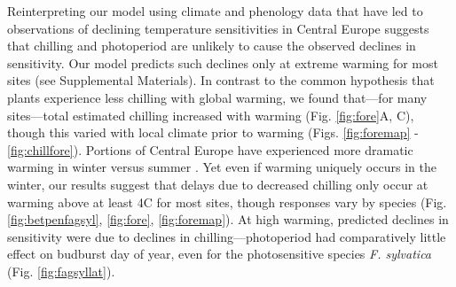 \documentclass{article}
\begin{document}

\par Reinterpreting our model using climate and phenology data that have led to observations of declining temperature sensitivities in Central Europe suggests that chilling and photoperiod are unlikely to cause the observed declines in sensitivity. Our model predicts such declines only at extreme warming for most sites (see Supplemental Materials). In contrast to the common hypothesis that plants experience less chilling with global warming, we found that---for many sites---total estimated chilling increased with warming (Fig. \ref{fig:fore}A, C), though this varied with local climate prior to warming (Figs. \ref{fig:foremap} - \ref{fig:chillfore}). 
Portions of Central Europe have experienced more dramatic warming in winter versus summer \emph{\citep[][though this certainly varies over time and space, \citet{Li2015}]{balling1998}}. Yet even if warming uniquely occurs in the winter, our results suggest that delays due to decreased chilling only occur at warming above at least 4\degree C for most sites, though responses vary by species (Fig. \ref{fig:betpenfagsyl}, \ref{fig:fore}, \ref{fig:foremap}). At high warming, predicted declines in sensitivity were due to declines in chilling---photoperiod had comparatively little effect on budburst day of year, even for the photosensitive species \emph{F. sylvatica} (Fig. \ref{fig:fagsyllat}). 
\end{document}
